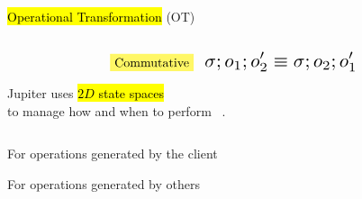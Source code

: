 \begin{frame}{}
  \centerline{\hl{Operational Transformation} (OT)~}

  \begin{columns}
      \begin{center}
	
      \end{center}
      \begin{center}
	
      \end{center}
  \end{columns}
\end{frame}

\begin{frame}{}

  \begin{equation*}
    \text{\hl{Commutative}\;\; \resizebox{0.35\textwidth}{!}{$\sigma; o_1; o_2' \equiv \sigma; o_2; o_1'$}}
  \end{equation*}

  \centerline{}
\end{frame}

\begin{frame}{}
  \begin{center}
    \resizebox{0.75\textwidth}{!}{}
  \end{center}
\end{frame}

\begin{frame}{}
  \begin{center}
    {\large Jupiter uses \hl{$2D$ state spaces}~ \\[5pt]
    to manage how and when to perform ~.}
  \end{center}


  \pause
  \begin{columns}
      \begin{description}
	\item[\textsc{Local} Dimension:] For operations generated by the client
	\item[\textsc{Global} Dimension:] For operations generated by others
      \end{description}
  \end{columns}
\end{frame}

